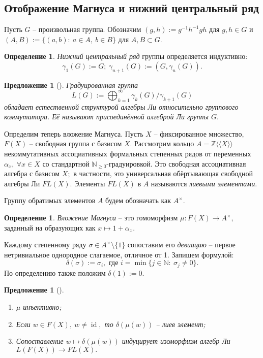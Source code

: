 \documentclass[10pt,a4paper]{article}
\DeclareMathOperator{\id}{id}
\def\ZZ{\mathbb{Z}}
\def\NN{\mathbb{N}}
\newtheorem{prp}[thm]{Предложение}
\theoremstyle{definition}
\newtheorem{dfn}[thm]{Определение}
\begin{document}
\subsection{Отображение Магнуса и нижний центральный ряд}
Пусть $G$ -- произвольная группа. Обозначим $(g,h):=g^{-1}h^{-1}gh$ для $g,h\in G$ и $(A,B):=\{(a,b):~a\in A,~b\in B\}$ для $A,B\subset G.$
\begin{dfn}
\emph{Нижний центральный ряд} группы определяется индуктивно: $$\gamma_1(G):=G;~\gamma_{n+1}(G):=(G,\gamma_n(G)).$$
\end{dfn}
\begin{prp}[\cite{magnus}] Градуированная группа
$$L(G):=\bigoplus_{k=1}^\infty \gamma_k(G)/\gamma_{k+1}(G)$$ обладает естественной структурой алгебры Ли относительно группового коммутатора. Её называют \emph{присоединённой алгеброй Ли} группы $G.$
\end{prp}
Определим теперь вложение Магнуса. Пусть $X$ -- фиксированное множество, $F(X)$ -- свободная группа с базисом $X.$ Рассмотрим кольцо $A=\ZZ\langle\!\langle X\rangle\!\rangle$ некоммутативных ассоциативных формальных степенных рядов от переменных $\alpha_x,~\forall x\in X$ со стандартной $\NN_{\geq 0}$-градуировкой. Это свободная ассоциативная алгебра с базисом $X;$ в частности, это универсальная обёртывающая свободной алгебры Ли $FL(X).$ Элементы $FL(X)$ в $A$ называются \emph{лиевыми элементами}.

Группу обратимых элементов $A$ будем обозначать как $A^\times.$
\begin{dfn}
\emph{Вложение Магнуса} -- это гомоморфизм $\mu:F(X)\to A^\times,$ заданный на образующих как $x\mapsto 1+\alpha_x.$ 
\end{dfn}
Каждому степенному ряду $\sigma\in A^\times\setminus\{1\}$ сопоставим его \emph{девиацию} -- первое нетривиальное однородное слагаемое, отличное от 1. Запишем формулой:
$$\delta(\sigma):=\sigma_i,\text{ где }i=\min\{j\in\NN:~\sigma_j\neq 0\}.$$
По определению также положим $\delta(1):=0.$
\begin{prp}[\cite{magnus}]
\begin{enumerate}
\item $\mu$ инъективно;
\item Если $w\in F(X),~w\neq\id,$ то $\delta(\mu(w))$ -- лиев элемент;
\item Сопоставление $w\mapsto \delta(\mu(w))$ индуцирует изоморфизм алгебр Ли $L(F(X))\to FL(X).$
\end{enumerate}
\end{prp}
\end{document}
